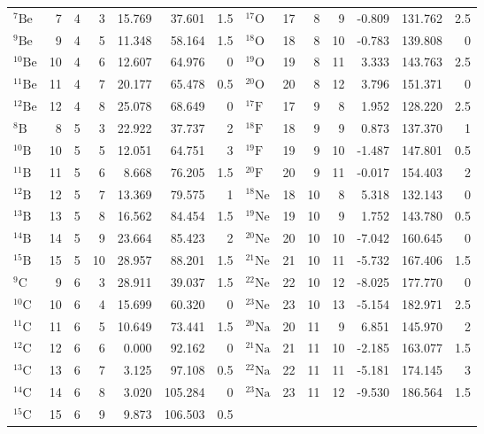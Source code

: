 \begin{center}
\begin{longtable}{@{}l r r r r r r @{\hspace{1.0em}} l r r r r r r@{}}
${}^{7}\mathrm{Be}$ & 7 & 4 & 3 & 15.769 & 37.601 & 1.5 & ${}^{17}\mathrm{O}$ & 17 & 8 & 9 & -0.809 & 131.762 & 2.5\\
${}^{9}\mathrm{Be}$ & 9 & 4 & 5 & 11.348 & 58.164 & 1.5 & ${}^{18}\mathrm{O}$ & 18 & 8 & 10 & -0.783 & 139.808 & 0\\
${}^{10}\mathrm{Be}$ & 10 & 4 & 6 & 12.607 & 64.976 & 0 & ${}^{19}\mathrm{O}$ & 19 & 8 & 11 & 3.333 & 143.763 & 2.5\\
${}^{11}\mathrm{Be}$ & 11 & 4 & 7 & 20.177 & 65.478 & 0.5 & ${}^{20}\mathrm{O}$ & 20 & 8 & 12 & 3.796 & 151.371 & 0\\
${}^{12}\mathrm{Be}$ & 12 & 4 & 8 & 25.078 & 68.649 & 0 & ${}^{17}\mathrm{F}$ & 17 & 9 & 8 & 1.952 & 128.220 & 2.5\\
${}^{8}\mathrm{B}$ & 8 & 5 & 3 & 22.922 & 37.737 & 2 & ${}^{18}\mathrm{F}$ & 18 & 9 & 9 & 0.873 & 137.370 & 1\\
${}^{10}\mathrm{B}$ & 10 & 5 & 5 & 12.051 & 64.751 & 3 & ${}^{19}\mathrm{F}$ & 19 & 9 & 10 & -1.487 & 147.801 & 0.5\\
${}^{11}\mathrm{B}$ & 11 & 5 & 6 & 8.668 & 76.205 & 1.5 & ${}^{20}\mathrm{F}$ & 20 & 9 & 11 & -0.017 & 154.403 & 2\\
${}^{12}\mathrm{B}$ & 12 & 5 & 7 & 13.369 & 79.575 & 1 & ${}^{18}\mathrm{Ne}$ & 18 & 10 & 8 & 5.318 & 132.143 & 0\\
${}^{13}\mathrm{B}$ & 13 & 5 & 8 & 16.562 & 84.454 & 1.5 & ${}^{19}\mathrm{Ne}$ & 19 & 10 & 9 & 1.752 & 143.780 & 0.5\\
${}^{14}\mathrm{B}$ & 14 & 5 & 9 & 23.664 & 85.423 & 2 & ${}^{20}\mathrm{Ne}$ & 20 & 10 & 10 & -7.042 & 160.645 & 0\\
${}^{15}\mathrm{B}$ & 15 & 5 & 10 & 28.957 & 88.201 & 1.5 & ${}^{21}\mathrm{Ne}$ & 21 & 10 & 11 & -5.732 & 167.406 & 1.5\\
${}^{9}\mathrm{C}$ & 9 & 6 & 3 & 28.911 & 39.037 & 1.5 & ${}^{22}\mathrm{Ne}$ & 22 & 10 & 12 & -8.025 & 177.770 & 0\\
${}^{10}\mathrm{C}$ & 10 & 6 & 4 & 15.699 & 60.320 & 0 & ${}^{23}\mathrm{Ne}$ & 23 & 10 & 13 & -5.154 & 182.971 & 2.5\\
${}^{11}\mathrm{C}$ & 11 & 6 & 5 & 10.649 & 73.441 & 1.5 & ${}^{20}\mathrm{Na}$ & 20 & 11 & 9 & 6.851 & 145.970 & 2\\
${}^{12}\mathrm{C}$ & 12 & 6 & 6 & 0.000 & 92.162 & 0 & ${}^{21}\mathrm{Na}$ & 21 & 11 & 10 & -2.185 & 163.077 & 1.5\\
${}^{13}\mathrm{C}$ & 13 & 6 & 7 & 3.125 & 97.108 & 0.5 & ${}^{22}\mathrm{Na}$ & 22 & 11 & 11 & -5.181 & 174.145 & 3\\
${}^{14}\mathrm{C}$ & 14 & 6 & 8 & 3.020 & 105.284 & 0 & ${}^{23}\mathrm{Na}$ & 23 & 11 & 12 & -9.530 & 186.564 & 1.5\\
${}^{15}\mathrm{C}$ & 15 & 6 & 9 & 9.873 & 106.503 & 0.5 & &&&&&&\\
\end{longtable}
\end{center}